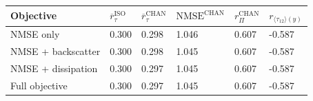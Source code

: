 \begin{tabular}{llllll}
\toprule
Objective & $\overline{r}_{\tau}^{\mathrm{ISO}}$ & $\overline{r}_{\tau}^{\mathrm{CHAN}}$ & $\mathrm{NMSE}^{\mathrm{CHAN}}$ & $r_{\Pi}^{\mathrm{CHAN}}$ & $r_{\langle \tau_{12} \rangle (y)}$ \\
\midrule
NMSE only & 0.300 & 0.298 & 1.046 & 0.607 & -0.587 \\
NMSE + backscatter & 0.300 & 0.298 & 1.045 & 0.607 & -0.587 \\
NMSE + dissipation & 0.300 & 0.297 & 1.045 & 0.607 & -0.587 \\
Full objective & 0.300 & 0.297 & 1.045 & 0.607 & -0.587 \\
\bottomrule
\end{tabular}

